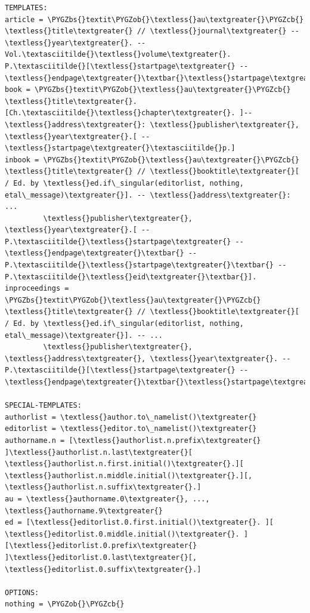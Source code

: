\documentclass[letterpaper,10pt,english]{sphinxmanual}
\def\PYGZbs{\char`\\}
\def\PYGZob{\char`\{}
\def\PYGZcb{\char`\}}
\begin{document}
\begin{Verbatim}[commandchars=\\\{\}]
TEMPLATES:
article = \PYGZbs{}textit\PYGZob{}\textless{}au\textgreater{}\PYGZcb{} \textless{}title\textgreater{} // \textless{}journal\textgreater{} -- \textless{}year\textgreater{}. -- Vol.\textasciitilde{}\textless{}volume\textgreater{}. P.\textasciitilde{}[\textless{}startpage\textgreater{} -- \textless{}endpage\textgreater{}\textbar{}\textless{}startpage\textgreater{}\textbar{}\textless{}eid\textgreater{}\textbar{}].
book = \PYGZbs{}textit\PYGZob{}\textless{}au\textgreater{}\PYGZcb{} \textless{}title\textgreater{}. [Ch.\textasciitilde{}\textless{}chapter\textgreater{}. ]-- \textless{}address\textgreater{}: \textless{}publisher\textgreater{}, \textless{}year\textgreater{}.[ -- \textless{}startpage\textgreater{}\textasciitilde{}p.]
inbook = \PYGZbs{}textit\PYGZob{}\textless{}au\textgreater{}\PYGZcb{} \textless{}title\textgreater{} // \textless{}booktitle\textgreater{}[ / Ed. by \textless{}ed.if\_singular(editorlist, nothing, etal\_message)\textgreater{}]. -- \textless{}address\textgreater{}: ...
         \textless{}publisher\textgreater{}, \textless{}year\textgreater{}.[ -- P.\textasciitilde{}\textless{}startpage\textgreater{} -- \textless{}endpage\textgreater{}\textbar{} -- P.\textasciitilde{}\textless{}startpage\textgreater{}\textbar{} -- P.\textasciitilde{}\textless{}eid\textgreater{}\textbar{}].
inproceedings = \PYGZbs{}textit\PYGZob{}\textless{}au\textgreater{}\PYGZcb{} \textless{}title\textgreater{} // \textless{}booktitle\textgreater{}[ / Ed. by \textless{}ed.if\_singular(editorlist, nothing, etal\_message)\textgreater{}]. -- ...
         \textless{}publisher\textgreater{}, \textless{}address\textgreater{}, \textless{}year\textgreater{}. -- P.\textasciitilde{}[\textless{}startpage\textgreater{} -- \textless{}endpage\textgreater{}\textbar{}\textless{}startpage\textgreater{}\textbar{}\textless{}eid\textgreater{}\textbar{}].

SPECIAL-TEMPLATES:
authorlist = \textless{}author.to\_namelist()\textgreater{}
editorlist = \textless{}editor.to\_namelist()\textgreater{}
authorname.n = [\textless{}authorlist.n.prefix\textgreater{} ]\textless{}authorlist.n.last\textgreater{}[ \textless{}authorlist.n.first.initial()\textgreater{}.][ \textless{}authorlist.n.middle.initial()\textgreater{}.][,  \textless{}authorlist.n.suffix\textgreater{}.]
au = \textless{}authorname.0\textgreater{}, ..., \textless{}authorname.9\textgreater{}
ed = [\textless{}editorlist.0.first.initial()\textgreater{}. ][ \textless{}editorlist.0.middle.initial()\textgreater{}. ][\textless{}editorlist.0.prefix\textgreater{} ]\textless{}editorlist.0.last\textgreater{}[,  \textless{}editorlist.0.suffix\textgreater{}.]

OPTIONS:
nothing = \PYGZob{}\PYGZcb{}
\end{Verbatim}
\end{document}
